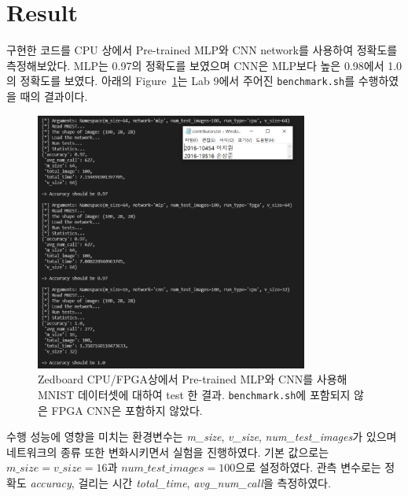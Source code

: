 \documentclass{article}
\begin{document}
\section{Result}
구현한 코드를 CPU 상에서 Pre-trained MLP와 CNN network를 사용하여 정확도를 측정해보았다. MLP는 0.97의 정확도를 보였으며 CNN은 MLP보다 높은 0.98에서 1.0의 정확도를 보였다. 아래의 Figure~\ref{fig5}는 Lab 9에서 주어진 \texttt{benchmark.sh}를 수행하였을 때의 결과이다. \\

\begin{figure}[htb!]
	\centering
	\includegraphics[width=0.8\textwidth]{fig/benchmark results.png}
\caption{Zedboard CPU/FPGA상에서 Pre-trained MLP와 CNN를 사용해 MNIST 데이터셋에 대하여 test 한 결과. \texttt{benchmark.sh}에 포함되지 않은 FPGA CNN은 포함하지 않았다.}
\label{fig5}
\end{figure}

수행 성능에 영향을 미치는 환경변수는 \textit{m\_size},  \textit{v\_size}, \textit{num\_test\_images}가 있으며 네트워크의 종류 또한 변화시키면서 실험을 진행하였다. 기본 값으로는 $\textit{m\_size}=\textit{v\_size}=16$과 $\textit{num\_test\_images}=100$으로 설정하였다. 관측 변수로는 정확도 \textit{accuracy}, 걸리는 시간 \textit{total\_time}, \textit{avg\_num\_call}을 측정하였다. 
\end{document}
